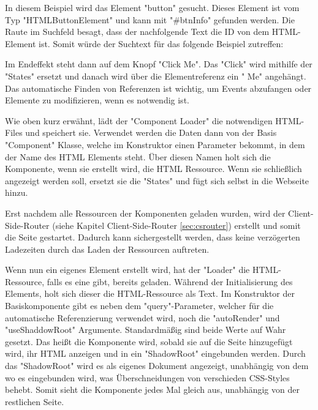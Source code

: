 
In diesem Beispiel wird das Element "button" gesucht. Dieses Element ist vom Typ "HTMLButtonElement" und kann mit "\#btnInfo" gefunden werden. Die Raute im Suchfeld besagt, dass der nachfolgende Text die ID von dem HTML-Element ist. Somit würde der Suchtext für das folgende Beispiel zutreffen:


Im Endeffekt steht dann auf dem Knopf "Click Me". Das "Click" wird mithilfe der
"States" ersetzt und danach wird über die Elementreferenz ein " Me" angehängt. Das automatische Finden von Referenzen ist wichtig, um Events abzufangen oder Elemente zu modifizieren, wenn es notwendig ist.

Wie oben kurz erwähnt, lädt der "Component Loader" die notwendigen HTML-Files und speichert sie. Verwendet werden die Daten dann von der Basis "Component" Klasse, welche im Konstruktor einen Parameter bekommt, in dem der Name des HTML Elements steht. Über diesen Namen holt sich die Komponente, wenn sie erstellt wird, die HTML Ressource. Wenn sie schließlich angezeigt werden soll, ersetzt sie die "States" und fügt sich selbst in die Webseite hinzu.


Erst nachdem alle Ressourcen der Komponenten geladen wurden, wird der Client-Side-Router (siehe Kapitel Client-Side-Router \ref{sec:csrouter}) erstellt und somit die Seite gestartet. Dadurch kann sichergestellt werden, dass keine verzögerten Ladezeiten durch das Laden der Ressourcen auftreten.


Wenn nun ein eigenes Element erstellt wird, hat der "Loader" die HTML-Ressource, falls es eine gibt, bereits geladen. Während der Initialisierung des Elements, holt sich dieser die HTML-Ressource als Text. Im Konstruktor der Basiskomponente gibt es neben dem "query"-Parameter, welcher für die automatische Referenzierung verwendet wird, noch die "autoRender" und "useShaddowRoot" Argumente. Standardmäßig sind beide Werte auf Wahr gesetzt. Das heißt die Komponente wird, sobald sie auf die Seite hinzugefügt wird, ihr HTML anzeigen und in ein "ShadowRoot" eingebunden werden. Durch das "ShadowRoot" wird es als eigenes Dokument angezeigt, unabhängig von dem wo es eingebunden wird, was Überschneidungen von verschieden CSS-Styles behebt. Somit sieht die Komponente jedes Mal gleich aus, unabhängig von der restlichen Seite.

